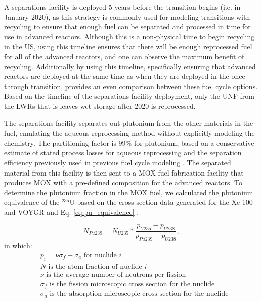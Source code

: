 A separations facility is deployed 5 years before the transition 
begins (i.e. in January 2020), as this strategy is commonly used for modeling 
transitions with recycling \cite{passerini_systematic_2014,richards_application_2021}
to ensure that enough fuel can be separated and 
processed in time for use in advanced reactors. Although this is a 
non-physical time to begin recycling in the US, using this timeline ensures 
that there will be enough reprocessed fuel for all of the advanced 
reactors, and one can observe the maximum benefit of recycling. Additionally 
by using this timeline, specifically ensuring that advanced reactors 
are deployed at the same time as when they are deployed in the once-through 
transition, provides an even comparison between these fuel cycle options.
Based on the timeline of the separations facility deployment, only the 
\gls{UNF} from the \glspl{LWR} that is leaves wet storage after 
2020 is reprocessed. 

The separations facility separates out plutonium from the other 
materials in the fuel, emulating the aqueous reprocessing method without 
explicitly modeling the chemistry. The partitioning factor is 99\% for
plutonium, based on a conservative estimate of stated 
process losses for aqueous reprocessing \cite{herbst_6_2011} and the 
separation efficiency previously used in previous fuel cycle modeling 
\cite{wigeland_nuclear_2014,sunny_transition_2015}. The separated 
material from this facility is then sent to a \gls{MOX} fuel fabrication 
facility that produces \gls{MOX} with a pre-defined composition for the 
advanced reactors. To determine the plutonium fraction in the 
\gls{MOX} fuel, we calculated the plutonium equivalence of the $^{235}$U 
based on the cross section data generated for the Xe-100 and VOYGR and 
Eq. \ref{eq:pu_equivalence} \cite{baker_comparison_1963}.

    \begin{equation}
        N_{Pu239} = N_{U235}*\frac{p_{U235} - p_{U238}}{p_{Pu239} - p_{U238}},
        \label{eq:pu_equivalence}
    \end{equation}
in which:
    \begin{align*}
        &p_i = \nu\sigma_f - \sigma_a \text{ for nuclide } i \\
        &N \text{ is the atom fraction of nuclide } i \\
        &\nu \text{ is the average number of neutrons per fission} \\
        &\sigma_f \text{ is the fission microscopic cross section for the nuclide} \\
        &\sigma_a \text{ is the absorption microscopic cross section for the nuclide} \\
    \end{align*}
    

